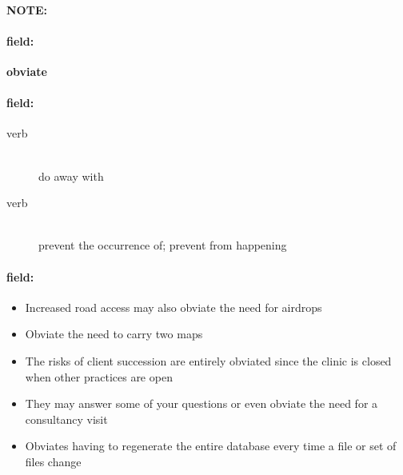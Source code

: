 \documentclass[12pt]{article}
\newenvironment{note}{\paragraph{NOTE:}}{}
\newenvironment{field}{\paragraph{field:}}{}
\begin{document}
\begin{note}
\begin{field}
\textbf{\large obviate}
\end{field}


\begin{field}
\begin{description}
\item[verb] \hfill \\ 
do away with

\item[verb] \hfill \\ 
prevent the occurrence of; prevent from happening

\end{description}
\end{field}

\begin{field}
\begin{itemize}
\item Increased road access may also obviate the need for airdrops
\item Obviate the need to carry two maps
\item The risks of client succession are entirely obviated since the clinic is closed when other practices are open
\item They may answer some of your questions or even obviate the need for a consultancy visit
\item Obviates having to regenerate the entire database every time a file or set of files change
\end{itemize}
\end{field}
\end{note}
\end{document}
